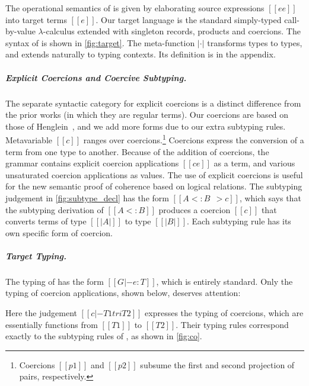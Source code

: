 The operational semantics of \name is given by elaborating source expressions
$[[ee]]$ into target terms $[[e]]$. Our target language \tname is the standard
simply-typed call-by-value $\lambda$-calculus extended with singleton records,
products and coercions. The syntax of \tname is shown in \cref{fig:target}. The
meta-function $| \cdot |$ transforms \name types to \tname types, and extends
naturally to typing contexts. Its definition is in the appendix.


\subparagraph{Explicit Coercions and Coercive Subtyping.}

The separate syntactic category for explicit coercions is a distinct
difference from the prior works (in which they are regular terms). Our coercions
are based on those of Henglein~\cite{Henglein_1994}, and we add more forms due to our
extra subtyping rules.
Metavariable $[[c]]$ ranges over coercions.\footnote{Coercions $[[p1]]$ and $[[p2]]$ subsume the first and second projection of pairs, respectively.}
Coercions express the conversion
of a term from one type to another. Because of the addition of coercions, the
grammar contains explicit coercion applications $[[c e]]$ as a term, and various
unsaturated coercion applications as values. The use of explicit coercions is useful for the new semantic
proof of coherence based on logical relations.
The subtyping judgement in \cref{fig:subtype_decl} has the form $[[A <: B ~~> c]]$, which says that the
subtyping derivation of $[[A <: B]]$ produces a coercion $[[c]]$ that converts
terms of type $[[ |A| ]]$ to type $[[ |B| ]]$. Each subtyping rule has its own
specific form of coercion.



\subparagraph{Target Typing.}
The typing of \tname has the form $[[G |- e : T]]$, which is entirely standard. Only the typing of coercion
applications, shown below, deserves attention:
\renewcommand\ottaltinferrule[4]{
  \inferrule*[narrower=0.5,right=#1,#2]
    {#3}
    {#4}
}
\begin{mathpar}
\end{mathpar}
Here the judgement $[[c |- T1 tri T2]]$ expresses the typing of coercions, which
are essentially functions from $[[T1]]$ to $[[T2]]$. Their typing
rules correspond exactly to the subtyping rules of \name, as
shown in \cref{fig:co}.
\renewcommand\ottaltinferrule[4]{
  \inferrule*[narrower=0.5,lab=#1,#2]
    {#3}
    {#4}
}

